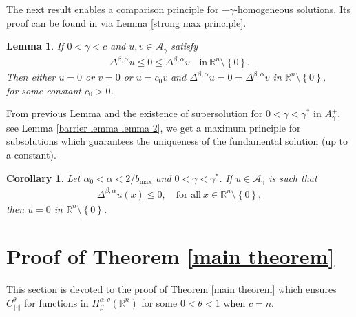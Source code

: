 \documentclass[10pt, leqno]{article}
\newtheorem{lemma}[theorem]{Lemma}
\newtheorem{corollary}[theorem]{Corollary}
\theoremstyle{definition}
\theoremstyle{remark}
\numberwithin{equation}{section}
\begin{document}
The next result enables a comparison principle for $-\gamma$-homogeneous solutions. Its proof can be found in \cite{CWW} via Lemma \ref{strong max principle}.


\begin{lemma}
\label{strong maximum principle for homogeneous function}
If $0 < \gamma < c$ and $u, v \in \mathcal{A}_{\gamma}$ satisfy
\begin{eqnarray}
\Delta^{\beta, \alpha}u \leq 0 \leq \Delta^{\beta, \alpha}v \quad \text{in} \ \mathbb{R}^{n}\setminus \left\lbrace 0 \right\rbrace.
\end{eqnarray}
Then either $u =0$ or $v=0$ or $u = c_{0} v$ and $\Delta^{\beta, \alpha}u = 0 = \Delta^{\beta, \alpha}v$ in $\mathbb{R}^{n}\setminus \left\lbrace 0 \right\rbrace$, \\ for some constant $c_{0}>0$.
\end{lemma}


From previous Lemma and the existence of supersolution for $0 < \gamma < \gamma^{\ast}$ in $A^{+}_{\gamma}$, see Lemma \ref{barrier lemma lemma 2}, we get a maximum principle for subsolutions which guarantees the uniqueness of the fundamental solution (up to a constant).
\begin{corollary}
\label{barrier lemma corollary 1}
Let $ \alpha_{0} < \alpha < 2/b_{\max}$ and $0 < \gamma < \gamma^{\ast}$. If $u \in \mathcal{A}_{\gamma}$ is such that
\begin{eqnarray}
\Delta^{\beta, \alpha} u (x) \leq 0, \quad \text{for all} \ x \in \mathbb{R}^{n} \setminus \left\lbrace 0 \right\rbrace,
\end{eqnarray}
then $u=0$ in $\mathbb{R}^{n} \setminus \left\lbrace 0 \right\rbrace$.
\end{corollary}



\section{Proof of Theorem \ref{main theorem}}

This section is devoted to the proof of Theorem \ref{main theorem} which ensures $C^{\theta}_{\Vert \cdot \Vert}$ for functions in $H_{\beta}^{\alpha, q}(\mathbb{R}^{n})$ for some $0 < \theta < 1$ when $c=n$.
\end{document}
